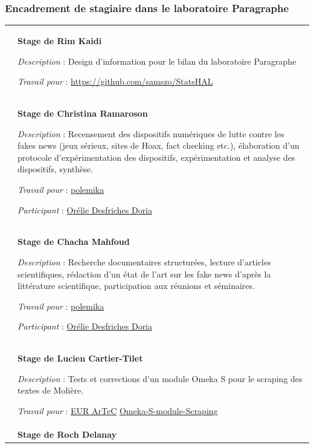 \documentclass[
  a4paper,
  DIV=11,
  numbers=noendperiod]{scrreprt}
\begin{document}
\subsubsection{Encadrement de stagiaire dans le laboratoire
Paragraphe}\label{encadrement-de-stagiaire-dans-le-laboratoire-paragraphe}

\begin{longtable}[]{@{}
  >{\raggedright\arraybackslash}p{}
  >{\raggedright\arraybackslash}p{}@{}}
\toprule\noalign{}
\endhead
\bottomrule\noalign{}
\endlastfoot
2023 & \textbf{Stage de Rim Kaidi}

\emph{Description} : Design d'information pour le bilan du laboratoire
Paragraphe \textbar{}

\emph{Travail pour} : \url{https://github.com/samszo/StatsHAL}
\textbar{} \\
2023 & \textbf{Stage de Christina Ramaroson}

\emph{Description} : Recensement des dispositifs numériques de lutte
contre les fakes news (jeux sérieux, sites de Hoax, fact checking etc.),
élaboration d'un protocole d'expérimentation des dispositifs,
expérimentation et analyse des dispositifs, synthèse. \textbar{}

\emph{Travail pour} :
\href{http://localhost/samszo/omk/s/fiches/item/299716}{polemika}
\textbar{}

\emph{Participant} :
\href{http://localhost/samszo/omk/s/fiches/item/62137}{Orélie Desfriches
Doria} \textbar{} \\
2021 & \textbf{Stage de Chacha Mahfoud}

\emph{Description} : Recherche documentaires structurées, lecture
d'articles scientifiques, rédaction d'un état de l'art sur les fake news
d'après la littérature scientifique, participation aux réunions et
séminaires. \textbar{}

\emph{Travail pour} :
\href{http://localhost/samszo/omk/s/fiches/item/299716}{polemika}
\textbar{}

\emph{Participant} :
\href{http://localhost/samszo/omk/s/fiches/item/62137}{Orélie Desfriches
Doria} \textbar{} \\
2019 & \textbf{Stage de Lucien Cartier-Tilet}

\emph{Description} : Tests et corrections d'un module Omeka S pour le
scraping des textes de Molière. \textbar{}

\emph{Travail pour} :
\href{http://localhost/samszo/omk/s/fiches/item/299592}{EUR ArTeC}
\href{http://localhost/samszo/omk/s/fiches/item/299717}{Omeka-S-module-Scraping}
\textbar{} \\
2018 & \textbf{Stage de Roch Delanay}


\end{longtable}
\end{document}
